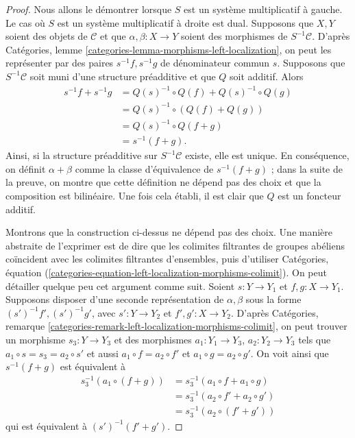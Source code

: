 \begin{proof}
Nous allons le démontrer lorsque $S$ est un système multiplicatif à gauche.
Le cas où $S$ est un système multiplicatif à droite est dual.
Supposons que $X, Y$ soient des objets de $\mathcal{C}$ et que
$\alpha, \beta : X \to Y$ soient des morphismes de $S^{-1}\mathcal{C}$. D'après
Catégories, lemme \ref{categories-lemma-morphisms-left-localization},
on peut les représenter par des paires $s^{-1}f, s^{-1}g$ de dénominateur commun $s$.
Supposons que $S^{-1}\mathcal{C}$ soit muni d'une structure préadditive et
que $Q$ soit additif. Alors
\begin{align*}
s^{-1}f+s^{-1}g
&=Q(s)^{-1}\circ Q(f)+Q(s)^{-1}\circ Q(g)\\
&=Q(s)^{-1}\circ(Q(f)+Q(g))\\
&=Q(s)^{-1}\circ Q(f+g)\\
&=s^{-1}(f+g).
\end{align*}
Ainsi, si la structure préadditive sur $S^{-1}\mathcal{C}$ existe, elle est unique.
En conséquence, on définit $\alpha + \beta$ comme la
classe d'équivalence de $s^{-1}(f + g)$ ; dans la suite de la preuve, on montre
que cette définition ne dépend pas des choix et que la composition est bilinéaire.
Une fois cela établi, il est clair que $Q$ est un foncteur additif.

\medskip\noindent
Montrons que la construction ci-dessus ne dépend pas des choix.
Une manière abstraite de l'exprimer est de dire que les colimites filtrantes de
groupes abéliens coïncident avec les colimites filtrantes d'ensembles, puis d'utiliser
Catégories,
équation (\ref{categories-equation-left-localization-morphisms-colimit}).
On peut détailler quelque peu cet argument comme suit.
Soient $s : Y \to Y_1$ et $f, g : X \to Y_1$. Supposons disposer d'une seconde
représentation de $\alpha, \beta$ sous la forme $(s')^{-1}f', (s')^{-1}g'$, avec
$s' : Y \to Y_2$ et $f', g' : X \to Y_2$. D'après
Catégories, remarque \ref{categories-remark-left-localization-morphisms-colimit},
on peut trouver un morphisme $s_3 : Y \to Y_3$ et des morphismes
$a_1 : Y_1 \to Y_3$, $a_2 : Y_2 \to Y_3$ tels que
$a_1 \circ s = s_3 = a_2 \circ s'$ et aussi
$a_1 \circ f = a_2 \circ f'$ et $a_1 \circ g = a_2 \circ g'$.
On voit ainsi que $s^{-1}(f + g)$ est équivalent à
\begin{align*}
s_3^{-1}(a_1 \circ (f + g)) & =
s_3^{-1}(a_1 \circ f + a_1 \circ g) \\
& = s_3^{-1}(a_2 \circ f' + a_2 \circ g') \\
& = s_3^{-1}(a_2 \circ (f' + g'))
\end{align*}
qui est équivalent à $(s')^{-1}(f' + g')$.


\end{proof}
